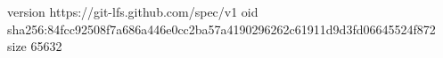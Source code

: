 version https://git-lfs.github.com/spec/v1
oid sha256:84fcc92508f7a686a446e0cc2ba57a4190296262c61911d9d3fd06645524f872
size 65632

